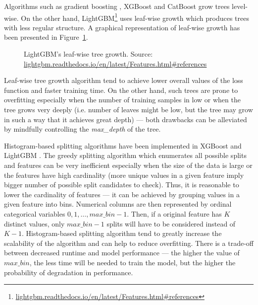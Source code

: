 \documentclass[magisterska, english]{pwr_wmat_praca_dyplomowa}
\theoremstyle{plain}
\numberwithin{theorem}{chapter}
\theoremstyle{definition}
\numberwithin{theorem}{chapter}
\begin{document}
Algorithms such as gradient boosting \cite{friedman_gbm}, XGBoost \cite{xgboost} and CatBoost \cite{catboost} grow trees level-wise. On the other hand, LightGBM\footnote{\url{lightgbm.readthedocs.io/en/latest/Features.html\#references}} uses leaf-wise growth which produces trees with less regular structure. A graphical representation of leaf-wise growth has been presented in Figure~\ref{fig:lightgbm_leaf_wise}.

\begin{figure}[H]
	\centering
	\caption{LightGBM's leaf-wise tree growth. Source: \url{lightgbm.readthedocs.io/en/latest/Features.html\#references}}
	\label{fig:lightgbm_leaf_wise}
\end{figure}

Leaf-wise tree growth algorithm tend to achieve lower overall values of the loss function and faster training time. On the other hand, such trees are prone to overfitting especially when the number of training samples in low or when the tree grows very deeply (i.e. number of leaves might be low, but the tree may grow in such a way that it achieves great depth) --- both drawbacks can be alleviated by mindfully controlling the \emph{max\_depth} of the tree. 

Histogram-based splitting algorithms have been implemented in XGBoost \cite{xgboost} and LightGBM \cite{lightgbm}. The greedy splitting algorithm which enumerates all possible splits and features can be very inefficient especially when the size of the data is large or the features have high cardinality (more unique values in a given feature imply bigger number of possible split candidates to check). Thus, it is reasonable to lower the cardinality of features --- it can be achieved by grouping values in a given feature into bins. Numerical columns are then represented by ordinal categorical variables $0,1,\ldots,max\_bin-1$. Then, if a original feature has $K$ distinct values, only $max\_bin-1$ splits will have to be considered instead of $K-1$. Histogram-based splitting algorithm tend to greatly increase the scalability of the algorithm and can help to reduce overfitting. There is a trade-off between decreased runtime and model performance --- the higher the value of $max\_bin$, the less time will be needed to train the model, but the higher the probability of degradation in performance. 
\end{document}
